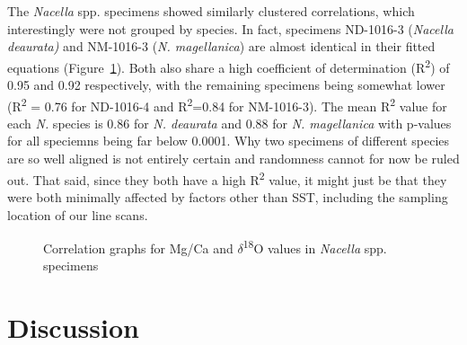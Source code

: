 \documentclass[
  authoryear,
  preprint,
  3p]{elsarticle}
\begin{document}
The \emph{Nacella} spp. specimens showed similarly clustered
correlations, which interestingly were not grouped by species. In fact,
specimens ND-1016-3 (\emph{Nacella deaurata)} and NM-1016-3 (\emph{N.
magellanica}) are almost identical in their fitted equations
(Figure~\ref{fig-Nac_Corr}). Both also share a high coefficient of
determination (R\textsuperscript{2}) of 0.95 and 0.92 respectively, with
the remaining specimens being somewhat lower (R\textsuperscript{2} =
0.76 for ND-1016-4 and R\textsuperscript{2}=0.84 for NM-1016-3). The
mean R\textsuperscript{2} value for each \emph{N.} species is 0.86 for
\emph{N. deaurata} and 0.88 for \emph{N. magellanica} with p-values for
all speciemns being far below 0.0001. Why two specimens of different
species are so well aligned is not entirely certain and randomness
cannot for now be ruled out. That said, since they both have a high
R\textsuperscript{2} value, it might just be that they were both
minimally affected by factors other than SST, including the sampling
location of our line scans.

\begin{figure}


\caption{\label{fig-Nac_Corr}Correlation graphs for Mg/Ca and
\(\delta\)\textsuperscript{18}O values in \emph{Nacella} spp. specimens}

\end{figure}%

\section{Discussion}\label{Discussion}
\end{document}
